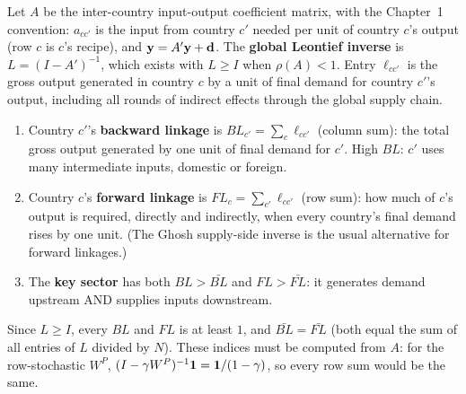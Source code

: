 \documentclass[../structural_economics_book.tex]{subfiles}
\begin{document}
\begin{definition}\label{ch16:def:global_leontief}
Let $A$ be the inter-country input-output coefficient matrix, with the Chapter~1 convention: $a_{cc'}$ is the input from country $c'$ needed per unit of country $c$'s output (row $c$ is $c$'s recipe), and $\mathbf{y} = A'\mathbf{y} + \mathbf{d}$. The \textbf{global Leontief inverse} is $L = (I - A')^{-1}$, which exists with $L \geq I$ when $\rho(A) < 1$. Entry $\ell_{cc'}$ is the gross output generated in country $c$ by a unit of final demand for country $c'$'s output, including all rounds of indirect effects through the global supply chain.
\begin{enumerate}
\item Country $c'$'s \textbf{backward linkage} is $BL_{c'} = \sum_c \ell_{cc'}$ (column sum): the total gross output generated by one unit of final demand for $c'$. High $BL$: $c'$ uses many intermediate inputs, domestic or foreign.
\item Country $c$'s \textbf{forward linkage} is $FL_c = \sum_{c'} \ell_{cc'}$ (row sum): how much of $c$'s output is required, directly and indirectly, when every country's final demand rises by one unit. (The Ghosh supply-side inverse is the usual alternative for forward linkages.)
\item The \textbf{key sector} \citep{rasmussen1956studies} has both $BL > \bar{BL}$ and $FL > \bar{FL}$: it generates demand upstream AND supplies inputs downstream.
\end{enumerate}
Since $L \geq I$, every $BL$ and $FL$ is at least $1$, and $\bar{BL} = \bar{FL}$ (both equal the sum of all entries of $L$ divided by $N$). These indices must be computed from $A$: for the row-stochastic $W^P$, $(I - \gamma W^P)^{-1}\mathbf{1} = \mathbf{1}/(1-\gamma)$, so every row sum would be the same.
\end{definition}
\end{document}
